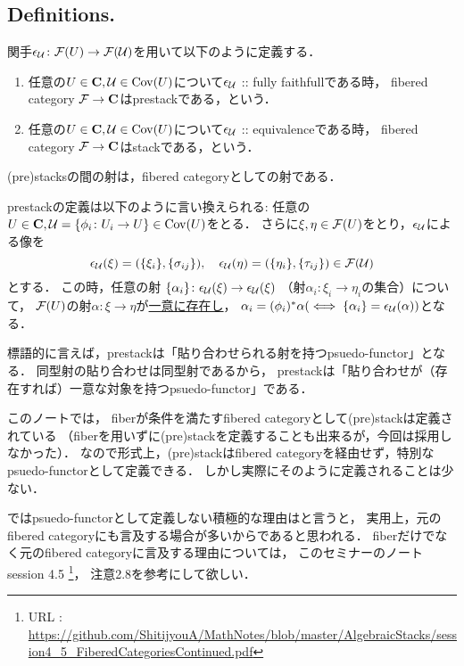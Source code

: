 \documentclass[a4paper, dvipdfmx]{jsarticle}
\begin{document}
\subsection{Definitions.}
\begin{Def}
    関手$\epsilon_{\mathcal{U}} \colon \mathcal{F}(U) \to \mathcal{F}(\mathcal{U})$を用いて以下のように定義する．
    \begin{enumerate}[label=(\roman*)]
    \item
        任意の$U \in \mathbf{C}, \mathcal{U} \in \operatorname{Cov}(U)$について$\epsilon_{\mathcal{U}}$ :: fully faithfullである時，
        fibered category $\mathcal{F} \to \mathbf{C}$はprestackである，という．
    \item
        任意の$U \in \mathbf{C}, \mathcal{U} \in \operatorname{Cov}(U)$について$\epsilon_{\mathcal{U}}$ :: equivalenceである時，
        fibered category $\mathcal{F} \to \mathbf{C}$はstackである，という．
    \end{enumerate}

    (pre)stacksの間の射は，fibered categoryとしての射である．
\end{Def}

\begin{Remark}
    prestackの定義は以下のように言い換えられる:
    任意の$U \in \mathbf{C}, \mathcal{U}=\{\phi_i \colon U_i \to U\} \in \operatorname{Cov}(U)$をとる．
    さらに$\xi, \eta \in \mathcal{F}(U)$をとり，$\epsilon_{\mathcal{U}}$による像を
    \[
        \epsilon_{\mathcal{U}}(\xi)=(\{\xi_i\}, \{\sigma_{ij}\}),\quad
        \epsilon_{\mathcal{U}}(\eta)=(\{\eta_i\}, \{\tau_{ij}\})
            \in \mathcal{F}(\mathcal{U}) 
    \]とする．
    この時，任意の射
    $\{\alpha_i\} \colon \epsilon_{\mathcal{U}}(\xi) \to \epsilon_{\mathcal{U}}(\xi)$
    （射$\alpha_i \colon \xi_i \to \eta_i$の集合）について，
    $\mathcal{F}(U)$の射$\alpha \colon \xi \to \eta$が\underline{一意に存在し}，
    $\alpha_i=(\phi_i)^*\alpha (\iff \{\alpha_i\}=\epsilon_{\mathcal{U}}(\alpha))$となる．

    標語的に言えば，prestackは「貼り合わせられる射を持つpsuedo-functor」となる．
    同型射の貼り合わせは同型射であるから，
    prestackは「貼り合わせが（存在すれば）一意な対象を持つpsuedo-functor」である．
\end{Remark}

\begin{Remark}
    このノートでは，
    fiberが条件を満たすfibered categoryとして(pre)stackは定義されている
    （fiberを用いずに(pre)stackを定義することも出来るが，今回は採用しなかった）．
    なので形式上，(pre)stackはfibered categoryを経由せず，特別なpsuedo-functorとして定義できる．
    しかし実際にそのように定義されることは少ない．

    ではpsuedo-functorとして定義しない積極的な理由はと言うと，
    実用上，元のfibered categoryにも言及する場合が多いからであると思われる．
    fiberだけでなく元のfibered categoryに言及する理由については，
    このセミナーのノート session 4.5
    \footnote{URL : \url{https://github.com/ShitijyouA/MathNotes/blob/master/AlgebraicStacks/session4_5_FiberedCategoriesContinued.pdf}}，
    注意2.8を参考にして欲しい．
\end{Remark}
\end{document}
